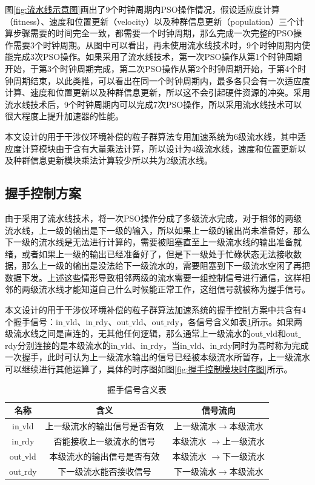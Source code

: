 图\ref{fig:流水线示意图}画出了9个时钟周期内PSO操作情况，假设适应度计算（fitness）、速度和位置更新（velocity）以及种群信息更新（population）三个计算步骤需要的时间完全一致，都需要一个时钟周期，那么完成一次完整的PSO操作需要3个时钟周期。从图中可以看出，再未使用流水线技术时，9个时钟周期内使能完成3次PSO操作。如果采用了流水线技术，第一次PSO操作从第1个时钟周期开始，于第3个时钟周期完成，第二次PSO操作从第2个时钟周期开始，于第4个时钟周期结束，以此类推，可以看出在同一个时钟周期内，最多各只会有一次适应度计算、速度和位置更新以及种群信息更新，所以这不会引起硬件资源的冲突。采用流水线技术后，9个时钟周期内可以完成7次PSO操作，所以采用流水线技术可以很大程度上提升加速器的性能。

本文设计的用于干涉仪环境补偿的粒子群算法专用加速系统为6级流水线，其中适应度计算模块由于含有大量乘法计算，所以设计为4级流水线，速度和位置更新以及种群信息更新模块乘法计算较少所以共为2级流水线。

\subsection{握手控制方案}
\label{握手控制方案}
由于采用了流水线技术，将一次PSO操作分成了多级流水完成，对于相邻的两级流水线，上一级的输出是下一级的输入，所以如果上一级的输出尚未准备好，那么下一级的流水线是无法进行计算的，需要被阻塞直至上一级流水线的输出准备就绪，或者如果上一级的输出已经准备好了，但是下一级处于忙碌状态无法接收数据，那么上一级的输出是没法给下一级流水的，需要阻塞到下一级流水空闲了再把数据下发。上述这些情形导致相邻两级的流水需要一组控制信号进行通信，这样相邻的两级流水线才能知道自己什么时候能正常工作，这组信号就被称为握手信号。

本文设计的用于干涉仪环境补偿的粒子群算法加速系统的握手控制方案中共含有4个握手信号：in$\_$vld、in$\_$rdy、out$\_$vld、out$\_$rdy，各信号含义如表\ref{tab:握手信号含义表}所示。如果两级流水线之间是直连的，无其他任何逻辑，那么通常上一级流水的out$\_$vld和out$\_$rdy分别连接的是本级流水的in$\_$vld、in$\_$rdy，当in$\_$vld、in$\_$rdy同时为高时称为完成一次握手，此时可认为上一级流水输出的信号已经被本级流水所暂存，上一级流水可以继续进行其他运算了，具体的时序图如图\ref{fig:握手控制模块时序图}所示。
\begin{table}[H]
    \centering
    \caption{握手信号含义表}
    \label{tab:握手信号含义表}
    \begin{tabular}{c|c|c}
        \hline
        名称                               & 含义                   &  信号流向         \\ \hline
        in$\_$vld              & 上一级流水的输出信号是否有效           &上一级流水$\rightarrow$本级流水        \\ \hline
        in$\_$rdy              & 否能接收上一级流水的信号              &本级流水  $\rightarrow$上一级流水       \\ \hline
        out$\_$vld             & 本级流水的输出信号是否有效            & 本级流水 $\rightarrow$下一级流水       \\ \hline
        out$\_$rdy             & 下一级流水能否接收信号                & 下一级流水$\rightarrow$本级流水       \\ \hline
    \end{tabular}
  \end{table}

